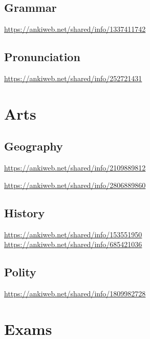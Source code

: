 \documentclass{article}
\begin{document}
	\subsection{Grammar}

\newline
	\url{https://ankiweb.net/shared/info/1337411742}
	\newline
	\subsection{Pronunciation}
	
	\newline
		\url{https://ankiweb.net/shared/info/252721431}
\newline

\section{Arts}
\subsection{Geography}

	
	\newline
	\url{https://ankiweb.net/shared/info/2109889812}
	\newline
	
	\url{https://ankiweb.net/shared/info/2806889860}
	\newline
	\subsection{History}

	
	\newline
	\url{https://ankiweb.net/shared/info/153551950}
	\newline
	\url{https://ankiweb.net/shared/info/685421036}
	\newline
	\subsection{Polity}

	
	\newline
	\url{https://ankiweb.net/shared/info/1809982728}
	\newline
	
\section{Exams}

	
\newline
\end{document}
